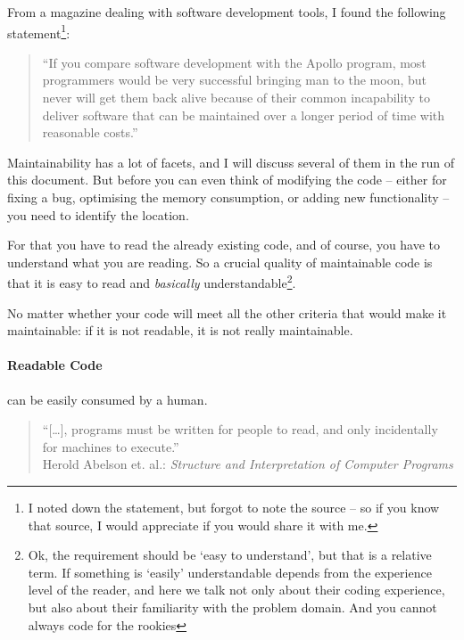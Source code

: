 \documentclass[11pt,a4paper, titlepage, parskip=half, headsepline, footsepline, cleardoublepage=current, headheight=1cm]{scrbook}
\begin{document}
From a magazine dealing with software development tools, I found the following statement\footnote{I noted down the statement, but forgot to note the source – so if you know that source, I would appreciate if you would share it with me.}:

\begin{quotation}
“If you compare software development with the Apollo program, most programmers would be very successful bringing man to the moon, but never will get them back alive because of their common incapability to deliver software that can be maintained over a longer period of time with reasonable costs.” \\
\autocite{UnknownSource1}
\end{quotation}

Maintainability has a lot of facets, and I will discuss several of them in the run of this document. But before you can even think of modifying the code – either for fixing a bug, optimising the memory consumption, or adding new functionality – you need to identify the location.  

For that you have to read the already existing code, and of course, you have to understand what you are reading. So a crucial quality of maintainable code is that it is easy to read and \textit{basically} understandable\footnote{Ok, the requirement should be ‘easy to understand’, but that is a relative term. If something is ‘easily’ understandable depends from the experience level of the reader, and here we talk not only about their coding experience, but also about their familiarity with the problem domain. And you cannot always code for the rookies}.

No matter whether your code will meet all the other criteria that would make it maintainable: if it is not readable, it is not really maintainable. 

\paragraph{Readable Code} can be easily consumed by a human.

\begin{quotation}
“[…], programs must be written for people to read, and only incidentally for machines to execute.”\\
Herold Abelson et. al.: \textit{Structure and Interpretation of Computer Programs}
\autocite{Sussman:StructureAndInterpretationOfComputerPrograms}
\end{quotation}
\end{document}
